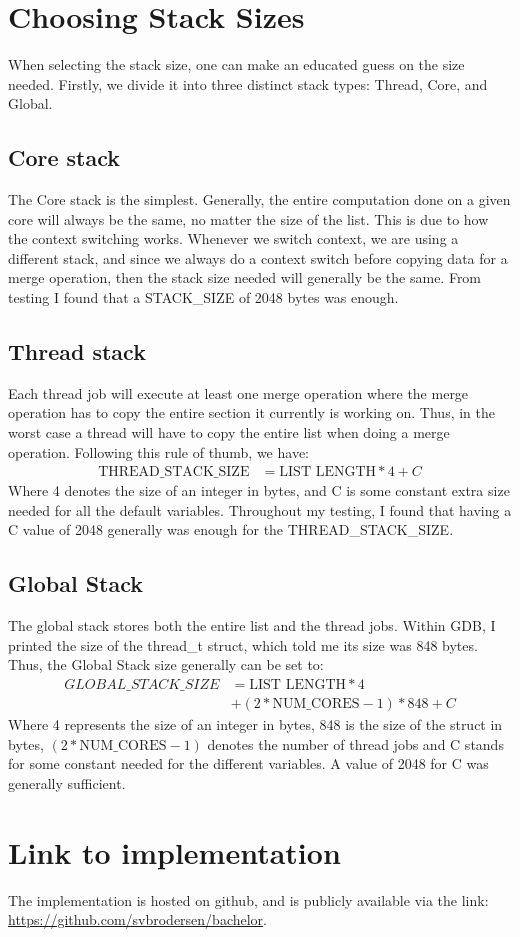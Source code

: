 \section{Choosing Stack Sizes}\label{ap:stack}
When selecting the stack size, one can make an educated guess on the size
needed. Firstly, we divide it into three distinct stack types: Thread, Core, and
Global.

\subsection*{Core stack}
The Core stack is the simplest. Generally, the entire computation done on a
given core will always be the same, no matter the size of the list. This is due
to how the context switching works. Whenever we switch context, we are using a
different stack, and since we always do a context switch before copying data for
a merge operation, then the stack size needed will generally be the same. From
testing I found that a STACK\_SIZE of 2048 bytes was enough.

\subsection*{Thread stack}
Each thread job will execute at least one merge operation where the merge
operation has to copy the entire section it currently is working on. Thus, in
the worst case a thread will have to copy the entire list when doing a merge
operation. Following this rule of thumb, we have:
\begin{align}
  \text{THREAD\_STACK\_SIZE} &= \text{LIST LENGTH} * 4 + C
\end{align}
Where 4 denotes the size of an integer in bytes, and C is some constant extra
size needed for all the default variables. Throughout my testing, I found that
having a C value of 2048 generally was enough for the THREAD\_STACK\_SIZE.

\subsection*{Global Stack}
The global stack stores both the entire list and the thread jobs. Within GDB, I
printed the size of the thread\_t struct, which told me its size was 848 bytes.
Thus, the Global Stack size generally can be set to:
\begin{align}
  GLOBAL\_STACK\_SIZE &= \text{LIST LENGTH} * 4  \\
                      &+ (2 * \text{NUM\_CORES} - 1) * 848  + C
\end{align}
Where 4 represents the size of an integer in bytes, 848 is the size of the
struct in bytes, $(2 * \text{NUM\_CORES} - 1)$ denotes the number of thread jobs
and C stands for some constant needed for the different variables. A value of
2048 for C was generally sufficient.

\section{Link to implementation}
The implementation is hosted on github, and is publicly available via the link:
\href{https://github.com/svbrodersen/bachelor}{https://github.com/svbrodersen/bachelor}.

